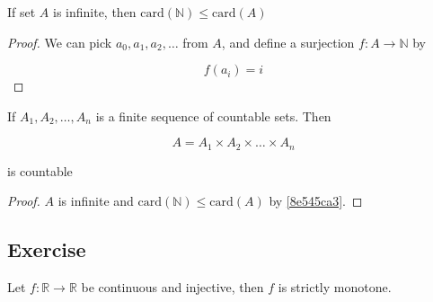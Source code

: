 \begin{thm}\label{8e545ca3}
    If set $A$ is infinite, then $\mathrm{card}(\mathbb{N}) \le \mathrm{card}(A)$
\end{thm}

\begin{proof}
    We can pick $a_0,a_1,a_2,\dots$ from $A$, and define a surjection $f: A \to \mathbb{N}$ by

    \[
        f(a_i) = i
    \]
\end{proof}

\begin{thm}
    If $A_1,A_2,\dots, A_n$ is a finite sequence of countable sets. Then

    \[
        A = A_1 \times A_2 \times \dots \times A_n
    \]

    is countable
\end{thm}

\begin{proof}
    $A$ is infinite and $\mathrm{card}(\mathbb{N}) \le \mathrm{card}(A)$ by \cref{8e545ca3}.
\end{proof}

\subsection{Exercise}

\begin{exercise}
    Let $f: \mathbb{R} \to \mathbb{R}$ be continuous and injective, then $f$ is strictly monotone.
\end{exercise}

